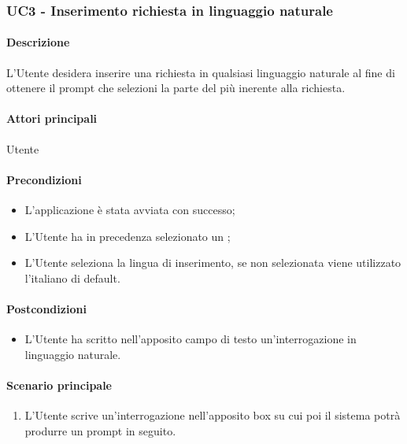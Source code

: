 \subsubsection{UC3 - Inserimento richiesta in linguaggio naturale}\label{UC3}
\paragraph*{Descrizione}
L’Utente desidera inserire una richiesta in qualsiasi linguaggio naturale al fine di ottenere il prompt che selezioni la parte del  più inerente alla richiesta. 

\paragraph*{Attori principali}
Utente

\paragraph*{Precondizioni}
\begin{itemize}
  \item L'applicazione è stata avviata con successo;
  \item L’Utente ha in precedenza selezionato un ; 
  \item L'Utente seleziona la lingua di inserimento, se non selezionata viene utilizzato l'italiano di default.
\end{itemize}

\paragraph*{Postcondizioni}
\begin{itemize}
  \item L’Utente ha scritto nell’apposito campo di testo un'interrogazione in linguaggio naturale.
\end{itemize}

\paragraph*{Scenario principale}
\begin{enumerate}
  \item L’Utente scrive un'interrogazione nell’apposito box su cui poi il sistema potrà produrre un prompt in seguito.
\end{enumerate}

